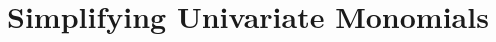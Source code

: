 \documentclass[20150903-160354-rs2.2-MarksMathNotebook.tex]{subfiles}
\begin{document}
%
%

\chapter{Simplifying Univariate Monomials}

\section{}\index{!}
\end{document}
